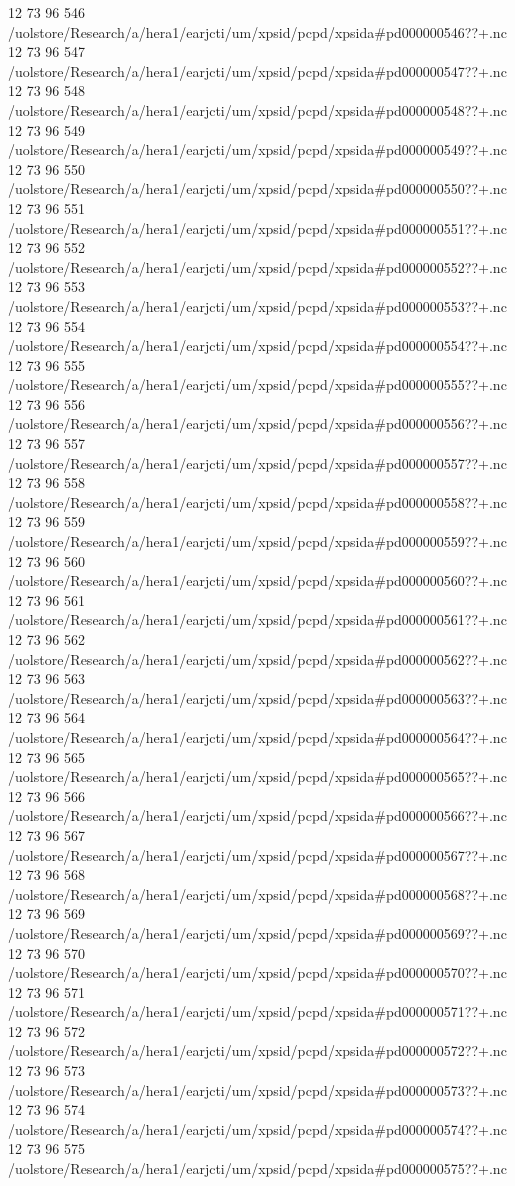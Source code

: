 12 73 96
546
/uolstore/Research/a/hera1/earjcti/um/xpsid/pcpd/xpsida#pd000000546??+.nc
12 73 96
547
/uolstore/Research/a/hera1/earjcti/um/xpsid/pcpd/xpsida#pd000000547??+.nc
12 73 96
548
/uolstore/Research/a/hera1/earjcti/um/xpsid/pcpd/xpsida#pd000000548??+.nc
12 73 96
549
/uolstore/Research/a/hera1/earjcti/um/xpsid/pcpd/xpsida#pd000000549??+.nc
12 73 96
550
/uolstore/Research/a/hera1/earjcti/um/xpsid/pcpd/xpsida#pd000000550??+.nc
12 73 96
551
/uolstore/Research/a/hera1/earjcti/um/xpsid/pcpd/xpsida#pd000000551??+.nc
12 73 96
552
/uolstore/Research/a/hera1/earjcti/um/xpsid/pcpd/xpsida#pd000000552??+.nc
12 73 96
553
/uolstore/Research/a/hera1/earjcti/um/xpsid/pcpd/xpsida#pd000000553??+.nc
12 73 96
554
/uolstore/Research/a/hera1/earjcti/um/xpsid/pcpd/xpsida#pd000000554??+.nc
12 73 96
555
/uolstore/Research/a/hera1/earjcti/um/xpsid/pcpd/xpsida#pd000000555??+.nc
12 73 96
556
/uolstore/Research/a/hera1/earjcti/um/xpsid/pcpd/xpsida#pd000000556??+.nc
12 73 96
557
/uolstore/Research/a/hera1/earjcti/um/xpsid/pcpd/xpsida#pd000000557??+.nc
12 73 96
558
/uolstore/Research/a/hera1/earjcti/um/xpsid/pcpd/xpsida#pd000000558??+.nc
12 73 96
559
/uolstore/Research/a/hera1/earjcti/um/xpsid/pcpd/xpsida#pd000000559??+.nc
12 73 96
560
/uolstore/Research/a/hera1/earjcti/um/xpsid/pcpd/xpsida#pd000000560??+.nc
12 73 96
561
/uolstore/Research/a/hera1/earjcti/um/xpsid/pcpd/xpsida#pd000000561??+.nc
12 73 96
562
/uolstore/Research/a/hera1/earjcti/um/xpsid/pcpd/xpsida#pd000000562??+.nc
12 73 96
563
/uolstore/Research/a/hera1/earjcti/um/xpsid/pcpd/xpsida#pd000000563??+.nc
12 73 96
564
/uolstore/Research/a/hera1/earjcti/um/xpsid/pcpd/xpsida#pd000000564??+.nc
12 73 96
565
/uolstore/Research/a/hera1/earjcti/um/xpsid/pcpd/xpsida#pd000000565??+.nc
12 73 96
566
/uolstore/Research/a/hera1/earjcti/um/xpsid/pcpd/xpsida#pd000000566??+.nc
12 73 96
567
/uolstore/Research/a/hera1/earjcti/um/xpsid/pcpd/xpsida#pd000000567??+.nc
12 73 96
568
/uolstore/Research/a/hera1/earjcti/um/xpsid/pcpd/xpsida#pd000000568??+.nc
12 73 96
569
/uolstore/Research/a/hera1/earjcti/um/xpsid/pcpd/xpsida#pd000000569??+.nc
12 73 96
570
/uolstore/Research/a/hera1/earjcti/um/xpsid/pcpd/xpsida#pd000000570??+.nc
12 73 96
571
/uolstore/Research/a/hera1/earjcti/um/xpsid/pcpd/xpsida#pd000000571??+.nc
12 73 96
572
/uolstore/Research/a/hera1/earjcti/um/xpsid/pcpd/xpsida#pd000000572??+.nc
12 73 96
573
/uolstore/Research/a/hera1/earjcti/um/xpsid/pcpd/xpsida#pd000000573??+.nc
12 73 96
574
/uolstore/Research/a/hera1/earjcti/um/xpsid/pcpd/xpsida#pd000000574??+.nc
12 73 96
575
/uolstore/Research/a/hera1/earjcti/um/xpsid/pcpd/xpsida#pd000000575??+.nc
